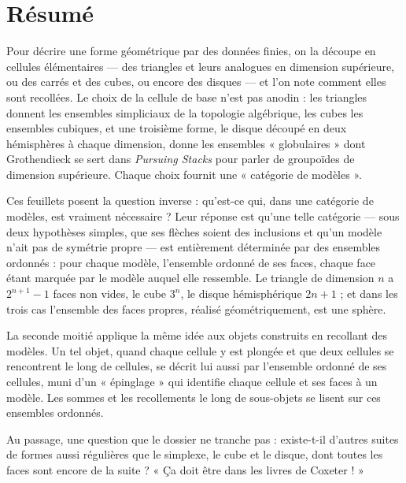 \documentclass[11pt,a4paper]{article}
\begin{document}
\section*{Résumé}

\begin{resume}
Pour décrire une forme géométrique par des données finies, on la découpe en
cellules élémentaires --- des triangles et leurs analogues en dimension
supérieure, ou des carrés et des cubes, ou encore des disques --- et l'on note
comment elles sont recollées. Le choix de la cellule de base n'est pas
anodin : les triangles donnent les ensembles simpliciaux de la topologie
algébrique, les cubes les ensembles cubiques, et une troisième forme, le
disque découpé en deux hémisphères à chaque dimension, donne les ensembles
« globulaires » dont Grothendieck se sert dans \emph{Pursuing Stacks} pour
parler de groupoïdes de dimension supérieure. Chaque choix fournit une « catégorie de
modèles ».

Ces feuillets posent la question inverse : qu'est-ce qui, dans une catégorie
de modèles, est vraiment nécessaire ? Leur réponse est qu'une telle catégorie
--- sous deux hypothèses simples, que ses flèches soient des inclusions et
qu'un modèle n'ait pas de symétrie propre --- est entièrement déterminée par
des ensembles ordonnés : pour chaque modèle, l'ensemble ordonné de ses faces,
chaque face étant marquée par le modèle auquel elle ressemble. Le triangle de
dimension $n$ a $2^{n+1} - 1$ faces non vides, le cube $3^{n}$, le disque
hémisphérique $2n + 1$ ; et dans les trois cas l'ensemble des faces propres,
réalisé géométriquement, est une sphère.

La seconde moitié applique la même idée aux objets construits en recollant
des modèles. Un tel objet, quand chaque cellule y est plongée et que deux
cellules se rencontrent le long de cellules, se décrit lui aussi par
l'ensemble ordonné de ses cellules, muni d'un « épinglage » qui identifie
chaque cellule et ses faces à un modèle. Les sommes et les recollements le long
de sous-objets se lisent sur ces ensembles ordonnés.

Au passage, une question que le dossier ne tranche pas : existe-t-il
d'autres suites de formes aussi régulières que le simplexe, le cube et le
disque, dont toutes les faces sont encore de la suite ? « Ça doit être dans
les livres de Coxeter ! »

\end{resume}
\end{document}
